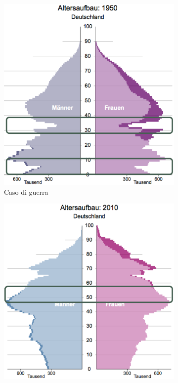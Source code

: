 \documentclass{article}
\begin{document}
\begin{figure}[htbp]
    \centering
    \begin{subfigure}[b]{0.3\textwidth}
      \centering
      \includegraphics[width=\textwidth]{media/demo_guerra.png}
      \caption{Caso di guerra}
      \label{fig:immagine1}
    \end{subfigure}
    \hfill
    \begin{subfigure}[b]{0.3\textwidth}
      \centering
      \includegraphics[width=\textwidth]{media/demo_baby boom.png}

\end{subfigure}
\end{figure}
\end{document}
